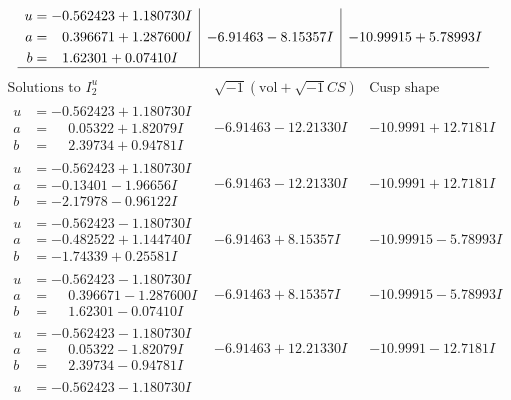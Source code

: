 \documentclass[1p]{elsarticle_modified}
\theoremstyle{definition}
\newcommand{\I}{\sqrt{-1}}
\begin{document}
$$\begin{array}{c|c|c}
\begin{aligned}
u &= -0.562423 + 1.180730 I \\
a &= \phantom{-}0.396671 + 1.287600 I \\
b &= \phantom{-}1.62301 + 0.07410 I\end{aligned}
 & -6.91463 - 8.15357 I & -10.99915 + 5.78993 I\\
 \hline 
 \end{array}$$\newpage$$\begin{array}{c|c|c}  
\text{Solutions to }I^u_{2}& \I (\text{vol} + \sqrt{-1}CS) & \text{Cusp shape}\\
 \hline 
\begin{aligned}
u &= -0.562423 + 1.180730 I \\
a &= \phantom{-}0.05322 + 1.82079 I \\
b &= \phantom{-}2.39734 + 0.94781 I\end{aligned}
 & -6.91463 - 12.21330 I & -10.9991 + 12.7181 I \\ \hline\begin{aligned}
u &= -0.562423 + 1.180730 I \\
a &= -0.13401 - 1.96656 I \\
b &= -2.17978 - 0.96122 I\end{aligned}
 & -6.91463 - 12.21330 I & -10.9991 + 12.7181 I \\ \hline\begin{aligned}
u &= -0.562423 - 1.180730 I \\
a &= -0.482522 + 1.144740 I \\
b &= -1.74339 + 0.25581 I\end{aligned}
 & -6.91463 + 8.15357 I & -10.99915 - 5.78993 I \\ \hline\begin{aligned}
u &= -0.562423 - 1.180730 I \\
a &= \phantom{-}0.396671 - 1.287600 I \\
b &= \phantom{-}1.62301 - 0.07410 I\end{aligned}
 & -6.91463 + 8.15357 I & -10.99915 - 5.78993 I \\ \hline\begin{aligned}
u &= -0.562423 - 1.180730 I \\
a &= \phantom{-}0.05322 - 1.82079 I \\
b &= \phantom{-}2.39734 - 0.94781 I\end{aligned}
 & -6.91463 + 12.21330 I & -10.9991 - 12.7181 I \\ \hline\begin{aligned}
u &= -0.562423 - 1.180730 I \\

\end{aligned}
\end{array}$$
\end{document}
